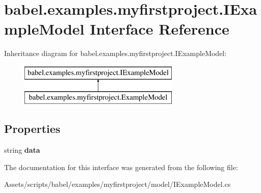 \hypertarget{interfacebabel_1_1examples_1_1myfirstproject_1_1_i_example_model}{\section{babel.\-examples.\-myfirstproject.\-I\-Example\-Model Interface Reference}
\label{interfacebabel_1_1examples_1_1myfirstproject_1_1_i_example_model}
}
Inheritance diagram for babel.\-examples.\-myfirstproject.\-I\-Example\-Model\-:\begin{figure}[H]
\begin{center}
\leavevmode
\includegraphics[height=2.000000cm]{interfacebabel_1_1examples_1_1myfirstproject_1_1_i_example_model}
\end{center}
\end{figure}
\subsection*{Properties}
\begin{DoxyCompactItemize}
\item 
\hypertarget{interfacebabel_1_1examples_1_1myfirstproject_1_1_i_example_model_abc1701f082259cd73965fe9e2db7298f}{string {\bfseries data}}\label{interfacebabel_1_1examples_1_1myfirstproject_1_1_i_example_model_abc1701f082259cd73965fe9e2db7298f}

\end{DoxyCompactItemize}


The documentation for this interface was generated from the following file\-:\begin{DoxyCompactItemize}
\item 
Assets/scripts/babel/examples/myfirstproject/model/I\-Example\-Model.\-cs\end{DoxyCompactItemize}

